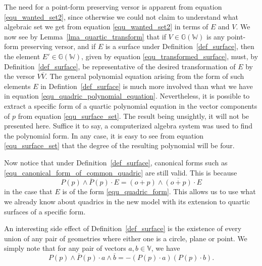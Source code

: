 \documentclass{birkjour}
\theoremstyle{definition}
\theoremstyle{remark}
\numberwithin{equation}{section}
\newcommand{\G}{\mathbb{G}}
\newcommand{\V}{\mathbb{V}}
\newcommand{\W}{\mathbb{W}}
\newcommand{\nvao}{o}
\begin{document}
The need for a point-form preserving versor is apparent from equation
\eqref{equ_wanted_set2}, since otherwise we could not claim to understand what
algebraic set we get from equation \eqref{equ_wanted_set2} in terms of $E$ and $V$.
We now see by Lemma~\ref{lma_quartic_transform}
that if $V\in\G(\W)$ is any point-form preserving versor, and if $E$
is a surface under Definition~\ref{def_surface}, then the element $E'\in\G(\W)$,
given by equation \eqref{equ_transformed_surface}, must, by Definition~\ref{def_surface},
be representative of the desired transformation of $E$ by the versor $V\overline{V}$.
The general polynomial equation arising from the form of
such elements $E$ in Defintion~\ref{def_surface} is much more involved than
what we have in equation \eqref{equ_quadric_polynomial_equation}.  Nevertheless, it is possible to extract
a specific form of a quartic polynomial equation in
the vector components of $p$ from equation \eqref{equ_surface_set}.
The result being unsightly, it will not be presented here.  Suffice it to say, a computerized
algebra system was used to find the polynomial form.  In any case, it is easy
to see from equation \eqref{equ_surface_set} that the degree of the resulting
polynomial will be four.

Now notice that under Definition~\ref{def_surface}, canonical forms
such as \eqref{equ_canonical_form_of_common_quadric} are still valid.
This is because
\begin{equation}
P(p)\wedge\overline{P}(p)\cdot E = (\nvao+p)\wedge\overline{(\nvao+p)}\cdot E
\end{equation}
in the case that $E$ is of the form \eqref{equ_quadric_form}.  This allows
us to use what we already know about quadrics in the new model with its extension to
quartic surfaces of a specific form.

An interesting side effect of Definition~\ref{def_surface} is the existence
of every union of any pair of geometries where either one is a circle, plane
or point.  We simply note that for any pair of vectors $a,b\in\V$, we have
\begin{equation}
P(p)\wedge\overline{P}(p)\cdot a\wedge\overline{b} = -(P(p)\cdot a)(P(p)\cdot b).
\end{equation}
\end{document}
